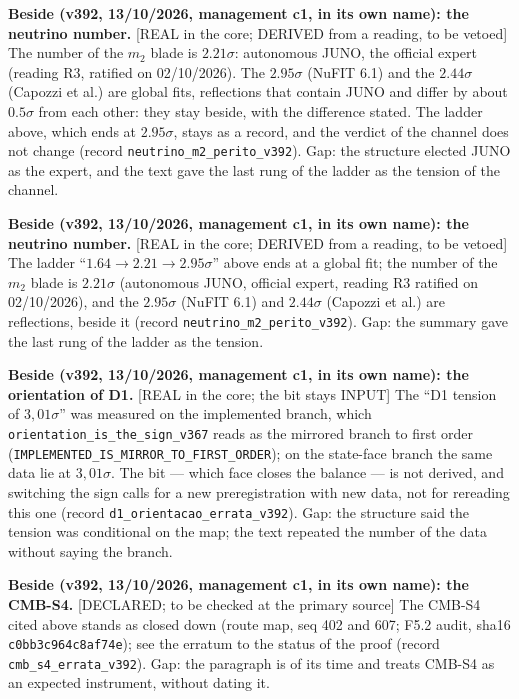 \documentclass[11pt]{article}
\theoremstyle{definition}\newtheorem{deriv}{Derivation}
\begin{document}
\textbf{Beside (v392, 13/10/2026, management c1, in its own name): the neutrino number.} \textsf{[REAL in the core; DERIVED from a reading, to be vetoed]} The number of the $m_2$ blade is $2.21\sigma$: autonomous JUNO, the official expert (reading R3, ratified on 02/10/2026). The $2.95\sigma$ (NuFIT 6.1) and the $2.44\sigma$ (Capozzi et al.) are global fits, reflections that contain JUNO and differ by about $0.5\sigma$ from each other: they stay beside, with the difference stated. The ladder above, which ends at $2.95\sigma$, stays as a record, and the verdict of the channel does not change (record \texttt{neutrino\_m2\_perito\_v392}). Gap: the structure elected JUNO as the expert, and the text gave the last rung of the ladder as the tension of the channel.

\textbf{Beside (v392, 13/10/2026, management c1, in its own name): the neutrino number.} \textsf{[REAL in the core; DERIVED from a reading, to be vetoed]} The ladder ``$1.64\to2.21\to2.95\sigma$'' above ends at a global fit; the number of the $m_2$ blade is $2.21\sigma$ (autonomous JUNO, official expert, reading R3 ratified on 02/10/2026), and the $2.95\sigma$ (NuFIT 6.1) and $2.44\sigma$ (Capozzi et al.) are reflections, beside it (record \texttt{neutrino\_m2\_perito\_v392}). Gap: the summary gave the last rung of the ladder as the tension.

\textbf{Beside (v392, 13/10/2026, management c1, in its own name): the orientation of D1.} \textsf{[REAL in the core; the bit stays INPUT]} The ``D1 tension of $3{,}01\sigma$'' was measured on the implemented branch, which \texttt{orientation\_is\_the\_sign\_v367} reads as the mirrored branch to first order (\texttt{IMPLEMENTED\_IS\_MIRROR\_TO\_FIRST\_ORDER}); on the state-face branch the same data lie at $3{,}01\sigma$. The bit --- which face closes the balance --- is not derived, and switching the sign calls for a new preregistration with new data, not for rereading this one (record \texttt{d1\_orientacao\_errata\_v392}). Gap: the structure said the tension was conditional on the map; the text repeated the number of the data without saying the branch.

\textbf{Beside (v392, 13/10/2026, management c1, in its own name): the CMB-S4.} \textsf{[DECLARED; to be checked at the primary source]} The CMB-S4 cited above stands as closed down (route map, seq 402 and 607; F5.2 audit, sha16 \texttt{c0bb3c964c8af74e}); see the erratum to the status of the proof (record \texttt{cmb\_s4\_errata\_v392}). Gap: the paragraph is of its time and treats CMB-S4 as an expected instrument, without dating it.
\end{document}

